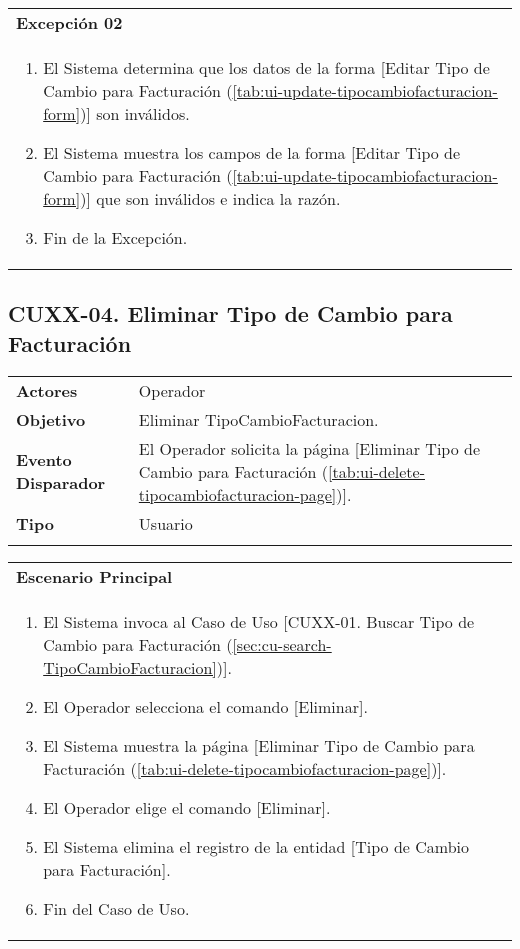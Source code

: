 \begin{tabular}{ p{15.5cm} }
	\textbf{Excepción 02} \\
	\begin{enumerate}
		\item El Sistema determina que los datos de la forma [Editar Tipo de Cambio para Facturación (\ref{tab:ui-update-tipocambiofacturacion-form})] son inválidos.
		\item El Sistema muestra los campos de la forma [Editar Tipo de Cambio para Facturación (\ref{tab:ui-update-tipocambiofacturacion-form})] que son inválidos e indica la razón.
		\item Fin de la Excepción.
	\end{enumerate}
\end{tabular}


\clearpage
\subsection{CUXX-04. Eliminar Tipo de Cambio para Facturación} \label{sec:cu-delete-TipoCambioFacturacion}

\begin{tabular}{ p{3.5cm} p{11.5cm} }
	\textbf{Actores} & Operador\\
	\textbf{Objetivo} & Eliminar TipoCambioFacturacion.\\
	\textbf{Evento Disparador} & El Operador solicita la página [Eliminar Tipo de Cambio para Facturación (\ref{tab:ui-delete-tipocambiofacturacion-page})].\\
	\textbf{Tipo} & Usuario\\
	\\
\end{tabular}

\begin{tabular}{ p{15.5cm} }
	\textbf{Escenario Principal} \\
	\begin{enumerate}
		\item El Sistema invoca al Caso de Uso [CUXX-01. Buscar Tipo de Cambio para Facturación (\ref{sec:cu-search-TipoCambioFacturacion})].
		\item El Operador selecciona el comando [Eliminar].
		\item El Sistema muestra la página [Eliminar Tipo de Cambio para Facturación (\ref{tab:ui-delete-tipocambiofacturacion-page})].
		\item El Operador elige el comando [Eliminar].
		\item El Sistema elimina el registro de la entidad [Tipo de Cambio para Facturación].
		\item Fin del Caso de Uso.
	\end{enumerate}
\end{tabular}

